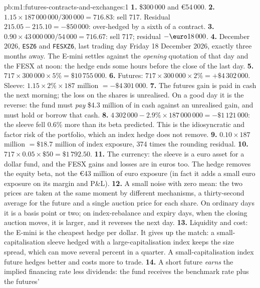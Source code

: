 \begin{solution}{pb:m1:futures-contracts-and-exchanges:1}
\textbf{1.} \$300\,000 and \euro54\,000.
\textbf{2.} $1.15 \times 187\,000\,000/300\,000 = 716.83$: sell 717. Residual
$215.05 - 215.10 = -\$50\,000$: over-hedged by a sixth of a contract.
\textbf{3.} $0.90 \times 43\,000\,000/54\,000 = 716.67$: sell 717; residual
$-\text{\euro}18\,000$.
\textbf{4.} December 2026, \texttt{ESZ6} and \texttt{FESXZ6}, last trading
day Friday 18 December 2026, exactly three months away. The E-mini settles
against the \emph{opening} quotation of that day and the FESX at noon: the
hedge ends some hours before the close of the last day.
\textbf{5.} $717 \times 300\,000 \times 5\% = \$10\,755\,000$.
\textbf{6.} Futures: $717 \times 300\,000 \times 2\% = +\$4\,302\,000$. Sleeve:
$1.15 \times 2\% \times 187$ million $= -\$4\,301\,000$.
\textbf{7.} The futures gain is paid in cash the next morning; the loss on
the shares is unrealised. On a good day it is the reverse: the fund must
\emph{pay} \$4.3 million of  in cash against an unrealised
gain, and must hold or borrow that cash.
\textbf{8.} $4\,302\,000 - 2.9\% \times 187\,000\,000 = -\$1\,121\,000$: the
sleeve fell 0.6\% more than its beta predicted. This is the idiosyncratic and
factor risk of the portfolio, which an index hedge does not remove.
\textbf{9.} $0.10 \times 187$ million $= \$18.7$ million of index exposure,
374 times the rounding residual.
\textbf{10.} $717 \times 0.05 \times \$50 = \$1\,792.50$.
\textbf{11.} The currency: the sleeve is a euro asset for a dollar fund, and
the FESX gains and losses are in euros too. The hedge removes the equity
beta, not the \euro43 million of euro exposure (in fact it adds a small
euro exposure on its margin and P\&L).
\textbf{12.} A small noise with zero mean: the two prices are taken at the
same moment by different mechanisms, a thirty-second average for the future
and a single auction price for each share. On ordinary days it is a basis
point or two; on index-rebalance and expiry days, when the closing auction
moves, it is larger, and it reverses the next day.
\textbf{13.} Liquidity and cost: the E-mini is the cheapest hedge per dollar.
It gives up the match: a small-capitalisation sleeve hedged with a
large-capitalisation index keeps the size spread, which can move several
percent in a quarter. A small-capitalisation index future hedges better and
costs more to trade.
\textbf{14.} A short future \emph{earns} the implied financing rate less
dividends: the fund receives the benchmark rate plus the futures' 
\end{solution}
